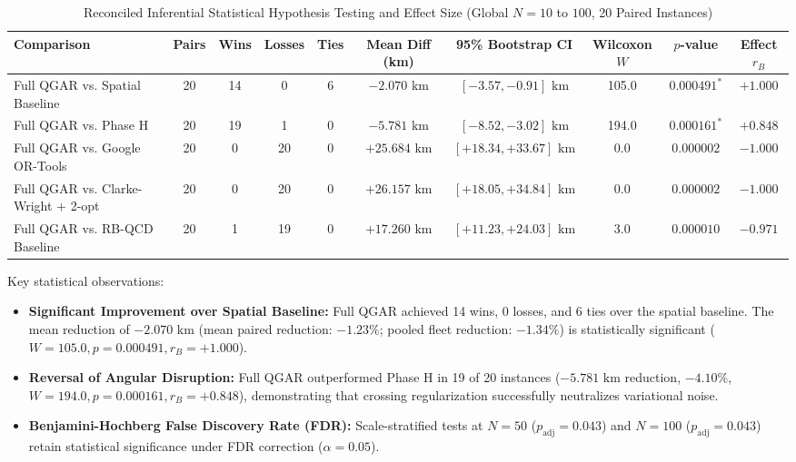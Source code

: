 \documentclass[journal,10pt]{IEEEtran}
\begin{document}
\begin{table}[t]
\caption{Reconciled Inferential Statistical Hypothesis Testing and Effect Size (Global $N=10$ to $100$, 20 Paired Instances)}
\label{tab:wilcoxon_tests}
\centering
\begin{tabular}{lccccccccc}
\toprule
\textbf{Comparison} & \textbf{Pairs} & \textbf{Wins} & \textbf{Losses} & \textbf{Ties} & \textbf{Mean Diff (km)} & \textbf{95\% Bootstrap CI} & \textbf{Wilcoxon $W$} & \textbf{$p$-value} & \textbf{Effect $r_B$} \\
\midrule
Full QGAR vs. Spatial Baseline & 20 & 14 & 0 & 6 & $-2.070\text{ km}$ & $[-3.57, -0.91]\text{ km}$ & 105.0 & $0.000491^*$ & $+1.000$ \\
Full QGAR vs. Phase H & 20 & 19 & 1 & 0 & $-5.781\text{ km}$ & $[-8.52, -3.02]\text{ km}$ & 194.0 & $0.000161^*$ & $+0.848$ \\
Full QGAR vs. Google OR-Tools & 20 & 0 & 20 & 0 & $+25.684\text{ km}$ & $[+18.34, +33.67]\text{ km}$ & 0.0 & $0.000002$ & $-1.000$ \\
Full QGAR vs. Clarke-Wright + 2-opt & 20 & 0 & 20 & 0 & $+26.157\text{ km}$ & $[+18.05, +34.84]\text{ km}$ & 0.0 & $0.000002$ & $-1.000$ \\
Full QGAR vs. RB-QCD Baseline & 20 & 1 & 19 & 0 & $+17.260\text{ km}$ & $[+11.23, +24.03]\text{ km}$ & 3.0 & $0.000010$ & $-0.971$ \\
\bottomrule
\end{tabular}
\end{table}

Key statistical observations:
\begin{itemize}
    \item \textbf{Significant Improvement over Spatial Baseline:} Full QGAR achieved 14 wins, 0 losses, and 6 ties over the spatial baseline. The mean reduction of $-2.070\text{ km}$ (mean paired reduction: $-1.23\%$; pooled fleet reduction: $-1.34\%$) is statistically significant ($W = 105.0, p = 0.000491, r_B = +1.000$).
    \item \textbf{Reversal of Angular Disruption:} Full QGAR outperformed Phase H in 19 of 20 instances ($-5.781\text{ km}$ reduction, $-4.10\%$, $W = 194.0, p = 0.000161, r_B = +0.848$), demonstrating that crossing regularization successfully neutralizes variational noise.
    \item \textbf{Benjamini-Hochberg False Discovery Rate (FDR):} Scale-stratified tests at $N=50$ ($p_{\text{adj}} = 0.043$) and $N=100$ ($p_{\text{adj}} = 0.043$) retain statistical significance under FDR correction ($\alpha = 0.05$).
\end{itemize}
\end{document}
